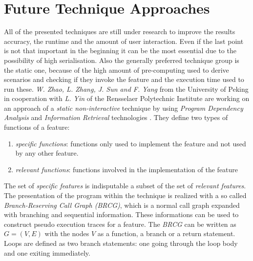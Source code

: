\section{Future Technique Approaches}
\label{sec:SNIAFL}
All of the presented techniques are still under research to improve the results accuracy, the runtime and the amount of user interaction. Even if the last point is not that important in the beginning it can be the most essential due to the possibility of high serialisation. Also the generally preferred technique group is the static one, because of the high amount of pre-computing used to derive scenarios and checking if they invoke the feature and the execution time used to run these.\newline
\textit{W. Zhao, L. Zhang, J. Sun and F. Yang} from the University of Peking in cooperation with \textit{L. Yin} of the Rensselaer Polytechnic Institute are working on an approach of a \textit{static non-interactive} technique by using \textit{Program Dependency Analysis} and \textit{Information Retrieval} technologies \cite{zhao2006sniafl}.\newline
They define two types of functions of a feature:
\begin{enumerate}
	\item \textit{specific functions}:
	functions only used to implement the feature and not used by any other feature.
	\item \textit{relevant functions}:
	functions involved in the implementation of the feature
\end{enumerate}
The set of \textit{specific features} is indisputable a subset of the set of \textit{ relevant features}.
The presentation of the program within the technique is realized with a so called \textit{Branch-Reserving Call Graph (BRCG)}, which is a normal call graph expanded with branching and sequential information. These informations can be used to construct pseudo execution traces for a feature. The \textit{BRCG} can be written as $G=(V,E)$ with the nodes $V$ as a function, a branch or a return statement. Loops are defined as two branch statements: one going through the loop body and one exiting immediately.


